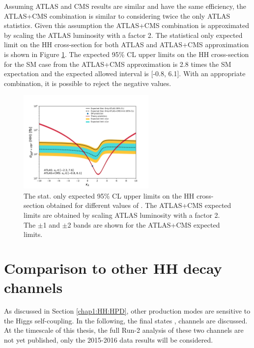 Assuming ATLAS and CMS results are similar and have the same efficiency, the ATLAS+CMS \HHyybb combination is similar to considering twice the only ATLAS statistics. Given this assumption the ATLAS+CMS combination is approximated by scaling the ATLAS \HHyybb luminosity with a factor 2. The statistical only expected limit on the HH cross-section for both ATLAS and ATLAS+CMS approximation is shown in Figure \ref{fig:HHyybb:CMS+ATLAS}. The expected 95\% CL upper limits on the HH cross-section for the SM case from the ATLAS+CMS approximation is 2.8 times the SM expectation and the expected allowed \kl interval is [-0.8, 6.1]. With an appropriate combination, it is possible to reject the negative \kl values. 

\begin{figure}[htbp]
    \centering
    \includegraphics[width=0.6\textwidth]{Ch5/Img/kappa_lambda_x2_stat.pdf}
    \begin{tcolorbox}[colback=black!5!white, colframe=white!75!black]
    \caption{The stat. only expected 95\% CL upper limits on the HH cross-section obtained for different values of \kl. The ATLAS+CMS expected limits are obtained by scaling ATLAS luminosity with a factor 2. The $\pm$1 and $\pm$2 bands are shown for the ATLAS+CMS expected limits.}
    \label{fig:HHyybb:CMS+ATLAS}
    \end{tcolorbox}
\end{figure}


\section{Comparison to other HH decay channels}
\label{HHyybb:HH}
As discussed in Section \ref{chap1:HH:HPD}, other production modes are sensitive to the Higgs self-coupling. In the following, the final states \bbbb, \bbtt channels are discussed. At the timescale of this thesis, the full Run-2 analysis of these two channels are not yet published, only the 2015-2016 data results will be considered.

